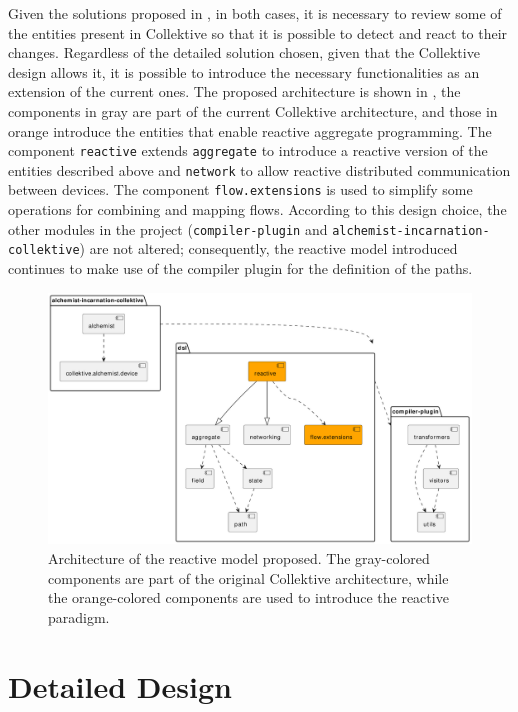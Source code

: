 Given the solutions proposed in , in both cases, it is necessary to review some of the entities present in Collektive so that it is possible to detect and react to their changes. Regardless of the detailed solution chosen, given that the Collektive design allows it, it is possible to introduce the necessary functionalities as an extension of the current ones. The proposed architecture is shown in , the components in gray are part of the current Collektive architecture, and those in orange introduce the entities that enable reactive aggregate programming. The component \texttt{reactive} extends \texttt{aggregate} to introduce a reactive version of the entities described above and \texttt{network} to allow reactive distributed communication between devices. The component \texttt{flow.extensions} is used to simplify some operations for combining and mapping flows. According to this design choice, the other modules in the project (\texttt{compiler-plugin} and \texttt{alchemist-incarnation-collektive}) are not altered; consequently, the reactive model introduced continues to make use of the compiler plugin for the definition of the paths.

\begin{figure}
    \centering
    \includegraphics[width=\linewidth]{figures/collektive-prm-architecture.pdf}
    \caption{Architecture of the reactive model proposed. The gray-colored components are part of the original Collektive architecture, while the orange-colored components are used to introduce the reactive paradigm.}
    \label{fig:collektive-prm-architecture}
\end{figure}

\section{Detailed Design}

